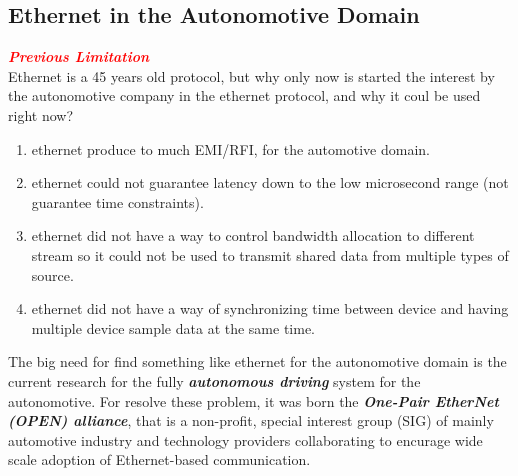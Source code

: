 \subsection{Ethernet in the Autonomotive Domain}
\begin{boxA}
    \textcolor{red}{\textbf{\textit{Previous Limitation}}} \\
    Ethernet is a 45 years old protocol, but why only now is started the interest by the autonomotive company in the ethernet protocol, and why it coul be used right now?
    \begin{enumerate}[nosep]
        \item ethernet produce to much EMI/RFI, for the automotive domain.
        \item ethernet could not guarantee latency down to the low microsecond range (not guarantee time constraints).
        \item ethernet did not have a way to control bandwidth allocation to different stream so it could not be used to transmit shared data from multiple types of source.
        \item ethernet did not have a way of synchronizing time between device and having multiple device sample data at the same time.
    \end{enumerate}
\end{boxA}
The big need for find something like ethernet for the autonomotive domain is the current research for the fully \textbf{\textit{autonomous driving}} system for the autonomotive.
For resolve these problem, it was born the \textbf{\textit{One-Pair EtherNet (OPEN) alliance}}, that is a non-profit, special interest group (SIG) of mainly automotive industry and technology providers collaborating to encurage wide scale adoption of Ethernet-based communication.
